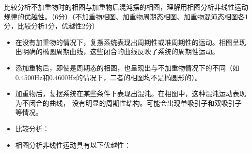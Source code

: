 \begin{question}
	比较分析不加重物时的相图与加重物后混沌摆的相图，理解用相图分析非线性运动规律的优越性。（6分）（不加重物相图、加重物周期态相图、加重物混沌态相图各1分，比较分析1分，优越性2分）
\end{question}
\begin{itemize}
	\item 在没有加重物的情况下，复摆系统表现出周期性或准周期性的运动。相图呈现出明确的椭圆周期曲线，这些闭合的曲线反映了系统的周期性运动。 
	
	\item 添加重物后，即使是周期态的相图，也呈现出与不加重物情况下的不同（如0.4500Hz和0.4600Hz的情况下，二者的相图均不是椭圆形的）。
	
	\item 加重物后，复摆系统在某些条件下表现出混沌。在相图中，这种混沌运动表现为不闭合的曲线， 没有明显的周期性结构。可能会出现单吸引子和双吸引子等情况。
	
	\item 比较分析：
	
	\item 相图分析非线性运动具有以下优越性：
	

\end{itemize}
